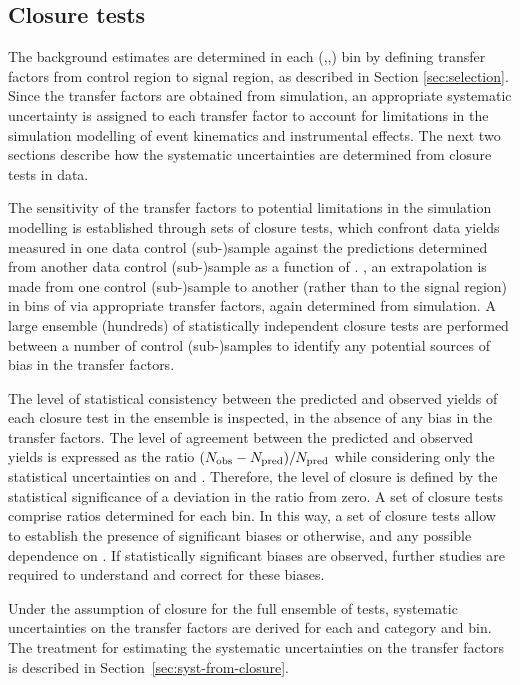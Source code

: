 \subsection{Closure tests}
\label{sec:closure-tests-desc}
\label{sec:bkgdnorm-syst}

The background estimates are determined in each (\nb,\njet,\HT) bin by
defining transfer factors from control region to signal region, as
described in Section \ref{sec:selection}. Since the transfer factors
are obtained from simulation, an appropriate systematic uncertainty is
assigned to each transfer factor to account for limitations in the
simulation modelling of event kinematics and instrumental effects. The
next two sections describe how the systematic uncertainties are
determined from closure tests in data.

The sensitivity of the transfer factors to potential limitations in
the simulation modelling is established through sets of closure tests,
which confront data yields measured in one data control (sub-)sample
against the predictions determined from another data control
(sub-)sample as a function of \scalht. \ie, an extrapolation is made
from one control (sub-)sample to another (rather than to the signal
region) in bins of \scalht via appropriate transfer factors, again
determined from simulation. A large ensemble (\ie hundreds) of
statistically independent closure tests are performed between a number
of control (sub-)samples to identify any potential sources of bias in
the transfer factors.

The level of statistical consistency between the predicted and
observed yields of each closure test in the ensemble is inspected, in
the absence of any bias in the transfer factors. The level of
agreement between the predicted and observed yields is expressed as
the ratio $(\nobs - \npre)/\npre$ while considering only the
statistical uncertainties on \npre and \nobs. Therefore, the level of
closure is defined by the statistical significance of a deviation in
the ratio from zero. A set of closure tests comprise ratios determined
for each \scalht bin. In this way, a set of closure tests allow to
establish the presence of significant biases or otherwise, and any
possible dependence on \scalht. If statistically significant biases
are observed, further studies are required to understand and correct
for these biases.

Under the assumption of closure for the full ensemble of tests,
systematic uncertainties on the transfer factors are derived for each
\njet and \nb category and \scalht bin. The treatment for
estimating the systematic uncertainties on the transfer factors is
described in Section~\ref{sec:syst-from-closure}.

